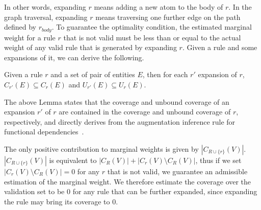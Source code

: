 In other words, expanding $r$ means adding a new atom to the body of $r$. In the graph traversal, expanding $r$ means traversing one further edge on the path defined by $r_{body}$. To guarantee the optimality condition, the estimated marginal weight for a rule $r$ that is not valid must be less than or equal to the actual weight of any valid rule that is generated by expanding $r$. Given a rule and some expansions of it, we can derive the following.

\begin{lemma} \label{lemma:krd_exp_cov}
	Given a rule $r$ and a set of pair of entities $E$, then for each $r'$ expansion of $r$, $C_{r'}(E) \subseteq C_r(E)$ and $U_{r'}(E) \subseteq U_r(E)$.
\end{lemma}
\vspace{0.5ex}

The above Lemma states that the coverage and unbound coverage of an expansion $r'$ of $r$ are contained in the coverage and unbound coverage of $r$, respectively, and directly derives from the augmentation inference rule for functional dependencies~\cite{abiteboul1995foundations}. 

The only positive contribution to marginal weights is given by $|C_{R \cup \{r\}}(V)|$. $|C_{R \cup \{r\}}(V)|$ is equivalent to $|C_{R}(V)| + |C_r(V) \setminus C_R(V)|$, thus if we set $|C_r(V) \setminus C_R(V)|=0$ for any $r$ that is not valid, we guarantee an admissible estimation of the marginal weight. We therefore estimate the coverage over the validation set to be $0$ for any rule that can be further expanded, since expanding the rule may bring its coverage to $0$.

